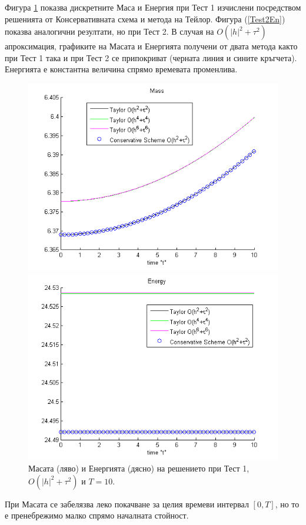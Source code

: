 \documentclass{article}
\newcommand{\rf}[1]{(\ref{#1})}
\begin{document}
Фигура \ref{Test1En} показва дискретните Маса и Енергия при Тест 1 изчислени посредством решенията от Консервативната схема и метода на Тейлор. 
Фигура \rf{Test2En} показва аналогични резултати, но при Тест 2. В случая на $O(|h|^2 +\tau^2)$ апроксимация, графиките на Масата и Енергията получени от двата метода както при Тест 1 така и при Тест 2 се припокриват (черната линия и сините кръгчета). Енергията е константна величина спрямо времевата променлива. 
\begin{figure}[ht]\vspace{0.2cm}
	\begin{minipage}[b]{0.4\linewidth}
		 \includegraphics[width=\linewidth]{../amitans/figures/Mass_bt3_c045_h005_Taylor_Conservative.png}
	\end{minipage}	
	\begin{minipage}[b]{0.4\linewidth}
		\includegraphics[width=\linewidth]{../amitans/figures/Energy_bt3_c045_h005_Taylor_Conservative.png}	
	\end{minipage}
\caption{Масата (ляво) и Енергията (дясно) на решението при Тест 1, $O(|h|^2 + \tau^2)$ и $T=10$.}
\label{Test1En}
\end{figure}
При Масата се забелязва леко покачване за целия времеви интервал $[0, T]$, но то е пренебрежимо малко спрямо началната стойност. 
\end{document}
